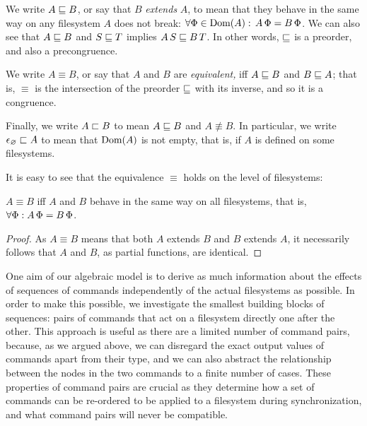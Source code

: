 \begin{mydef}
We write $A\sqsubseteq B$, or say that $B$ \emph{extends} $A$,
to mean that they behave in the same way
on any filesystem $A$ does not break:
$\forall \Phi\in\textrm{Dom}({A}):\,A\,\Phi=B\,\Phi$.
We can also see that $A\sqsubseteq B$ and $S\sqsubseteq T$ implies $A\, S\sqsubseteq B\, T$.
In other words, $\sqsubseteq$ is a preorder, and also a precongruence.

We write $A\equiv B$,
or say that $A$ and $B$ are \emph{equivalent,}
iff $A\sqsubseteq B$ and $B\sqsubseteq A$;
that is, $\equiv$ is the intersection of the preorder $\sqsubseteq$ with its inverse,
and so it is a congruence.

Finally, we write $A\sqsubset B$ to mean $A\sqsubseteq B$ and $A\nequiv B$.
In particular, we write $\epsilon_\varnothing\sqsubset{A}$
to mean that $\textrm{Dom}({A})$ is not empty, that is, if $A$ is defined on some filesystems.
\end{mydef}

It is easy to see that the equivalence $\equiv$ holds on the level of filesystems:
\begin{mylem}
$A\equiv B$
iff $A$ and $B$ behave in the same way on
all filesystems, that is, $\forall \Phi: A\,\Phi=B\,\Phi$.
\end{mylem}
\begin{proof}
As $A\equiv B$ means that both $A$ extends $B$ and $B$ extends $A$, it necessarily
follows that $A$ and $B$, as partial functions, are identical.
\end{proof}


\myskip
One aim of our algebraic model is to
derive as much information about the effects of sequences
of commands independently of the actual filesystems as possible.
In order to make this possible, we investigate the smallest building
blocks of sequences: pairs of commands that act on a filesystem directly one after the other.
This approach is useful as there are a limited number of command pairs,
because, as we argued above, we can disregard the exact output values of commands apart from their type,
and we can also abstract the relationship between the nodes in the two commands
to a finite number of cases.
These properties of command pairs are crucial as they determine
how a set of commands can be re-ordered to be applied to a filesystem
during synchronization, and what command pairs will never be compatible.

